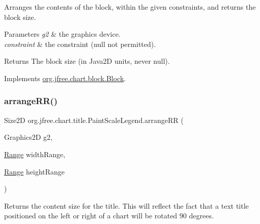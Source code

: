 Arranges the contents of the block, within the given constraints, and returns the block size.


\begin{DoxyParams}{Parameters}
{\em g2} & the graphics device. \\
\hline
{\em constraint} & the constraint ({\ttfamily null} not permitted).\\
\hline
\end{DoxyParams}
\begin{DoxyReturn}{Returns}
The block size (in Java2D units, never {\ttfamily null}). 
\end{DoxyReturn}


Implements \mbox{\hyperlink{interfaceorg_1_1jfree_1_1chart_1_1block_1_1_block_ab4cabbc237c5277a4a0018bab930e5fe}{org.\+jfree.\+chart.\+block.\+Block}}.

\mbox{\label{classorg_1_1jfree_1_1chart_1_1title_1_1_paint_scale_legend_a2820db9ece0205df7de815a05a2aec53}} 
\subsubsection{\texorpdfstring{arrange\+R\+R()}{arrangeRR()}}
{\footnotesize\ttfamily Size2D org.\+jfree.\+chart.\+title.\+Paint\+Scale\+Legend.\+arrange\+RR (\begin{DoxyParamCaption}\item[{Graphics2D}]{g2,  }\item[{\mbox{\hyperlink{classorg_1_1jfree_1_1data_1_1_range}{Range}}}]{width\+Range,  }\item[{\mbox{\hyperlink{classorg_1_1jfree_1_1data_1_1_range}{Range}}}]{height\+Range }\end{DoxyParamCaption})\hspace{0.3cm}{\ttfamily [protected]}}

Returns the content size for the title. This will reflect the fact that a text title positioned on the left or right of a chart will be rotated 90 degrees.


